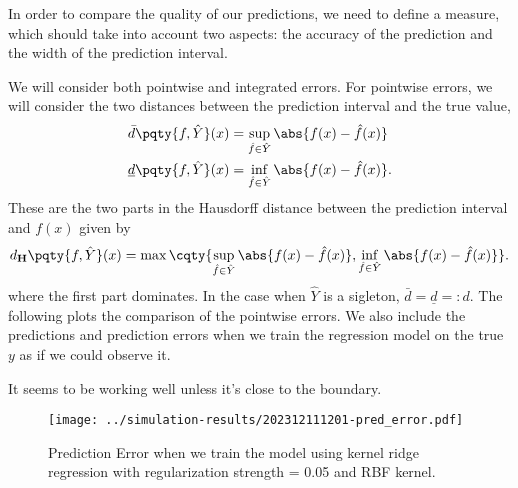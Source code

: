 \documentclass[12pt]{article}
\begin{document}
In order to compare the quality of our predictions, we need to define a measure, which should take into account two aspects: the accuracy of the prediction and the width of the prediction interval.

We will consider both pointwise and integrated errors. For pointwise errors, we will consider the two distances between the prediction interval and the true value,
\begin{align*}
    \bar{d}\pqty{f, \hat{Y}}(x)       & = \sup_{\hat{f} \in \hat{Y}} \abs{f(x) - \hat{f}(x)}  \\
    \underline{d}\pqty{f, \hat{Y}}(x) & = \inf_{\hat{f} \in \hat{Y}} \abs{f(x) - \hat{f}(x)}.
\end{align*}
These are the two parts in the Hausdorff distance between the prediction interval and \(f(x)\) given by
\begin{equation*}
    d_{\mathbf{H}}\pqty{f, \hat{Y}}(x) = \max\cqty{\sup_{\hat{f} \in \hat{Y}} \abs{f(x) - \hat{f}(x)}, \inf_{\hat{f} \in \hat{Y}} \abs{f(x) - \hat{f}(x)}}.
\end{equation*}
where the first part dominates. In the case when \(\hat{Y}\) is a sigleton, \(\bar{d} = \underline{d} = : d\). The following plots the comparison of the pointwise errors. We also include the predictions and prediction errors when we train the regression model on the true \(y\) as if we could observe it.

It seems to be working well unless it's close to the boundary.

\begin{figure}[ht]
    \centering
    \texttt{[image: ../simulation-results/202312111201-pred\_error.pdf]}
    \caption{Prediction Error when we train the model using kernel ridge regression with regularization strength = 0.05 and RBF kernel.}
    \label{fig:pred_error}
\end{figure}
\end{document}

